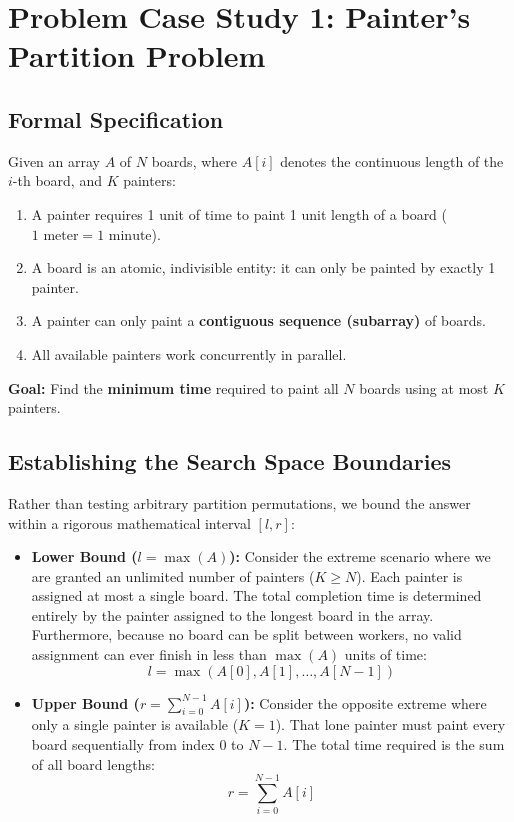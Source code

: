 \documentclass[10pt,journal,compsoc,onecolumn]{IEEEtran}
\begin{document}
\section{Problem Case Study 1: Painter's Partition Problem}
\label{sec:painters}

\subsection{Formal Specification}

Given an array $A$ of $N$ boards, where $A[i]$ denotes the continuous length of the $i$-th board, and $K$ painters:
\begin{enumerate}
    \item A painter requires 1 unit of time to paint 1 unit length of a board ($1\text{ meter} = 1\text{ minute}$).
    \item A board is an atomic, indivisible entity: it can only be painted by exactly 1 painter.
    \item A painter can only paint a \textbf{contiguous sequence (subarray)} of boards.
    \item All available painters work concurrently in parallel.
\end{enumerate}

\textbf{Goal:} Find the \textbf{minimum time} required to paint all $N$ boards using at most $K$ painters.

\subsection{Establishing the Search Space Boundaries}

Rather than testing arbitrary partition permutations, we bound the answer within a rigorous mathematical interval $[l, r]$:

\begin{itemize}
    \item \textbf{Lower Bound ($l = \max(A)$):}
    Consider the extreme scenario where we are granted an unlimited number of painters ($K \ge N$). Each painter is assigned at most a single board. The total completion time is determined entirely by the painter assigned to the longest board in the array. Furthermore, because no board can be split between workers, no valid assignment can ever finish in less than $\max(A)$ units of time:
    \[
    l = \max(A[0], A[1], \dots, A[N-1])
    \]

    \item \textbf{Upper Bound ($r = \sum_{i=0}^{N-1} A[i]$):}
    Consider the opposite extreme where only a single painter is available ($K = 1$). That lone painter must paint every board sequentially from index $0$ to $N - 1$. The total time required is the sum of all board lengths:
    \[
    r = \sum_{i=0}^{N-1} A[i]
    \]
\end{itemize}
\end{document}
